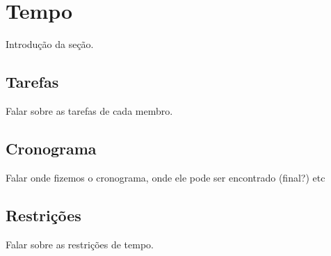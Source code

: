 \chapter{Tempo}

Introdução da seção.

\section{Tarefas}

Falar sobre as tarefas de cada membro.

\section{Cronograma}

Falar onde fizemos o cronograma, onde ele pode ser encontrado (final?) etc

\section{Restrições}

Falar sobre as restrições de tempo.
